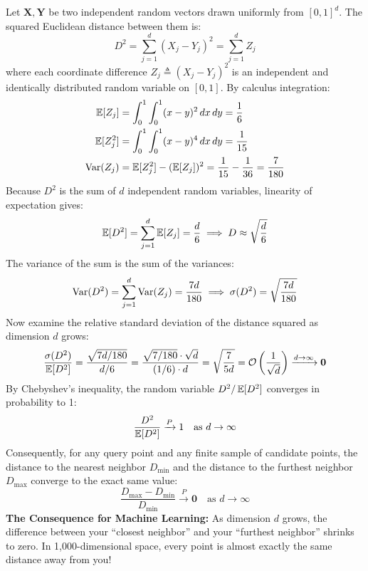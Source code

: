 Let $\mathbf{X}, \mathbf{Y}$ be two independent random vectors drawn uniformly from $[0, 1]^d$. The squared Euclidean distance between them is:
\begin{equation}
D^2 = \sum_{j=1}^d (X_j - Y_j)^2 = \sum_{j=1}^d Z_j
\end{equation}
where each coordinate difference $Z_j \triangleq (X_j - Y_j)^2$ is an independent and identically distributed random variable on $[0, 1]$. By calculus integration:
\begin{align}
\operatorname{\mathbb{E}}[Z_j] &= \int_0^1 \int_0^1 (x - y)^2 \, dx \, dy = \frac{1}{6} \\
\operatorname{\mathbb{E}}[Z_j^2] &= \int_0^1 \int_0^1 (x - y)^4 \, dx \, dy = \frac{1}{15} \\
\operatorname{Var}(Z_j) &= \operatorname{\mathbb{E}}[Z_j^2] - (\operatorname{\mathbb{E}}[Z_j])^2 = \frac{1}{15} - \frac{1}{36} = \frac{7}{180}
\end{align}
Because $D^2$ is the sum of $d$ independent random variables, linearity of expectation gives:
\begin{equation}
\operatorname{\mathbb{E}}[D^2] = \sum_{j=1}^d \operatorname{\mathbb{E}}[Z_j] = \frac{d}{6} \implies D \approx \sqrt{\frac{d}{6}}
\end{equation}
The variance of the sum is the sum of the variances:
\begin{equation}
\operatorname{Var}(D^2) = \sum_{j=1}^d \operatorname{Var}(Z_j) = \frac{7d}{180} \implies \sigma(D^2) = \sqrt{\frac{7d}{180}}
\end{equation}
Now examine the relative standard deviation of the distance squared as dimension $d$ grows:
\begin{equation}
\frac{\sigma(D^2)}{\operatorname{\mathbb{E}}[D^2]} = \frac{\sqrt{7d / 180}}{d / 6} = \frac{\sqrt{7/180} \cdot \sqrt{d}}{(1/6) \cdot d} = \sqrt{\frac{7}{5d}} = \mathcal{O}\left( \frac{1}{\sqrt{d}} \right) \xrightarrow{d \to \infty} \mathbf{0}
\end{equation}
By Chebyshev's inequality, the random variable $D^2 / \operatorname{\mathbb{E}}[D^2]$ converges in probability to 1:
\begin{equation}
\frac{D^2}{\operatorname{\mathbb{E}}[D^2]} \xrightarrow{P} 1 \quad \text{as } d \to \infty
\end{equation}
Consequently, for any query point and any finite sample of candidate points, the distance to the nearest neighbor $D_{\min}$ and the distance to the furthest neighbor $D_{\max}$ converge to the exact same value:
\begin{equation}
\frac{D_{\max} - D_{\min}}{D_{\min}} \xrightarrow{P} \mathbf{0} \quad \text{as } d \to \infty
\label{eq:distance_concentration_ped}
\end{equation}
\textbf{The Consequence for Machine Learning:} As dimension $d$ grows, the difference between your ``closest neighbor'' and your ``furthest neighbor'' shrinks to zero. In 1,000-dimensional space, every point is almost exactly the same distance away from you! 

